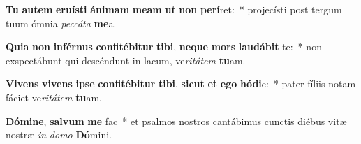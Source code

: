 \item \textbf{Tu} \textbf{au}\textbf{tem} \textbf{e}\textbf{ru}\textbf{ís}\textbf{ti} \textbf{á}\textbf{ni}\textbf{mam} \textbf{me}\textbf{am} \textbf{ut} \textbf{non} \textbf{per}\textbf{í}ret:~* projecísti post tergum tuum ómnia \textit{pec}\textit{cá}\textit{ta} \textbf{me}a.
\item \textbf{Qui}\textbf{a} \textbf{non} \textbf{in}\textbf{fér}\textbf{nus} \textbf{con}\textbf{fi}\textbf{té}\textbf{bi}\textbf{tur} \textbf{ti}\textbf{bi}, \textbf{ne}\textbf{que} \textbf{mors} \textbf{lau}\textbf{dá}\textbf{bit} te:~* non exspectábunt qui descéndunt in lacum, ve\textit{ri}\textit{tá}\textit{tem} \textbf{tu}am.
\item \textbf{Vi}\textbf{vens} \textbf{vi}\textbf{vens} \textbf{ip}\textbf{se} \textbf{con}\textbf{fi}\textbf{té}\textbf{bi}\textbf{tur} \textbf{ti}\textbf{bi}, \textbf{sic}\textbf{ut} \textbf{et} \textbf{e}\textbf{go} \textbf{hó}\textbf{di}e:~* pater fíliis notam fáciet ve\textit{ri}\textit{tá}\textit{tem} \textbf{tu}am.
\item \textbf{Dó}\textbf{mi}\textbf{ne}, \textbf{sal}\textbf{vum} \textbf{me} fac~* et psalmos nostros cantábimus cunctis diébus vitæ nostræ \textit{in} \textit{do}\textit{mo} \textbf{Dó}mini.
